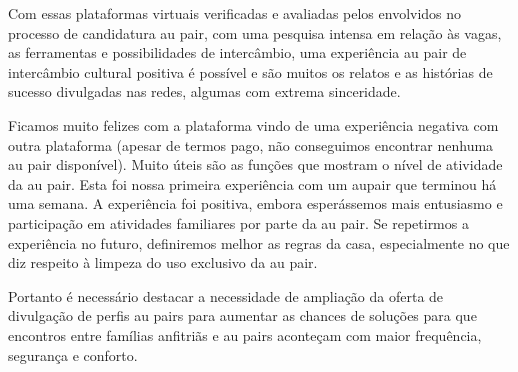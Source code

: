     Com essas plataformas virtuais verificadas e avaliadas pelos envolvidos no processo de candidatura au pair, com uma pesquisa intensa em relação às vagas, as ferramentas e possibilidades de intercâmbio, uma experiência au pair de intercâmbio cultural positiva é possível e são muitos os relatos e as histórias de sucesso divulgadas nas redes, algumas com extrema sinceridade.
    
    \begin{citacao}
    Ficamos muito felizes com a plataforma vindo de uma experiência negativa com outra plataforma (apesar de termos pago, não conseguimos encontrar nenhuma au pair disponível). Muito úteis são as funções que mostram o nível de atividade da au pair. Esta foi nossa primeira experiência com um aupair que terminou há uma semana. A experiência foi positiva, embora esperássemos mais entusiasmo e participação em atividades familiares por parte da au pair. Se repetirmos a experiência no futuro, definiremos melhor as regras da casa, especialmente no que diz respeito à limpeza do uso exclusivo da au pair.
    \cite{auPair.com2022}
    \end{citacao}
    
    Portanto é necessário destacar a necessidade de ampliação da oferta de divulgação de perfis au pairs para aumentar as chances de soluções para que encontros entre famílias anfitriãs e au pairs aconteçam com maior frequência, segurança e conforto.